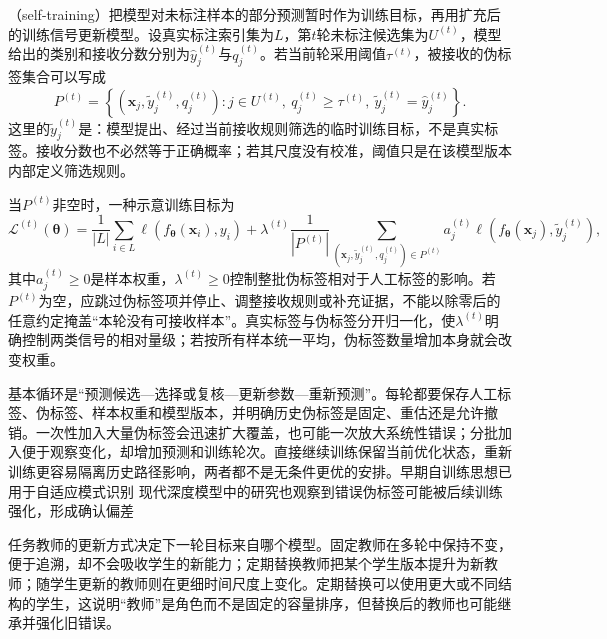 （self-training）把模型对未标注样本的部分预测暂时作为训练目标，再用扩充后的训练信号更新模型。设真实标注索引集为$L$，第$t$轮未标注候选集为$U^{(t)}$，模型给出的类别和接收分数分别为$\widehat y_j^{(t)}$与$q_j^{(t)}$。若当前轮采用阈值$\tau^{(t)}$，被接收的伪标签集合可以写成
\begin{equation}
  P^{(t)}
  =
  \left\{
    \left(\bm{x}_j,\widetilde y_j^{(t)},q_j^{(t)}\right)
    :
    j\in U^{(t)},\
    q_j^{(t)}\geq\tau^{(t)},\
    \widetilde y_j^{(t)}=\widehat y_j^{(t)}
  \right\}.
  \label{eq:knowledge-acquisition-pseudo-label-set}
\end{equation}
这里的$\widetilde y_j^{(t)}$是\term{伪标签}：模型提出、经过当前接收规则筛选的临时训练目标，不是真实标签。接收分数也不必然等于正确概率；若其尺度没有校准，阈值只是在该模型版本内部定义筛选规则。

当$P^{(t)}$非空时，一种示意训练目标为
\begin{equation}
  \mathcal{L}^{(t)}(\bm{\theta})
  =
  \frac{1}{|L|}\sum_{i\in L}\ell\!\left(f_{\bm{\theta}}(\bm{x}_i),y_i\right)
  +
  \lambda^{(t)}
  \frac{1}{|P^{(t)}|}
  \sum_{(\bm{x}_j,\widetilde y_j^{(t)},q_j^{(t)})\in P^{(t)}}
  a_j^{(t)}
  \ell\!\left(f_{\bm{\theta}}(\bm{x}_j),\widetilde y_j^{(t)}\right),
  \label{eq:knowledge-acquisition-self-training-objective}
\end{equation}
其中$a_j^{(t)}\geq0$是样本权重，$\lambda^{(t)}\geq0$控制整批伪标签相对于人工标签的影响。若$P^{(t)}$为空，应跳过伪标签项并停止、调整接收规则或补充证据，不能以除零后的任意约定掩盖“本轮没有可接收样本”。真实标签与伪标签分开归一化，使$\lambda^{(t)}$明确控制两类信号的相对量级；若按所有样本统一平均，伪标签数量增加本身就会改变权重。

\Needspace{110mm}
基本循环是“预测候选—选择或复核—更新参数—重新预测”。每轮都要保存人工标签、伪标签、样本权重和模型版本，并明确历史伪标签是固定、重估还是允许撤销。一次性加入大量伪标签会迅速扩大覆盖，也可能一次放大系统性错误；分批加入便于观察变化，却增加预测和训练轮次。直接继续训练保留当前优化状态，重新训练更容易隔离历史路径影响，两者都不是无条件更优的安排。早期自训练思想已用于自适应模式识别
现代深度模型中的研究也观察到错误伪标签可能被后续训练强化，形成确认偏差

任务教师的更新方式决定下一轮目标来自哪个模型。固定教师在多轮中保持不变，便于追溯，却不会吸收学生的新能力；定期替换教师把某个学生版本提升为新教师；随学生更新的教师则在更细时间尺度上变化。定期替换可以使用更大或不同结构的学生，这说明“教师”是角色而不是固定的容量排序，但替换后的教师也可能继承并强化旧错误。

